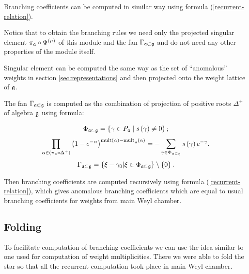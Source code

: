 \documentclass[a4paper,12pt]{article}
\theoremstyle{definition} \newtheorem{Def}{Definition}
\begin{document}
Branching coefficients can be computed in similar way using formula
(\ref{recurrent-relation}). 


Notice that to obtain the branching
rules we need only the projected singular element $\pi _{\frak{a}}\circ \Psi
^{\left( \mu\right) }$ of this module 
and the fan $\Gamma
_{\frak{a}\subset \frak{g}}$ and do not need any other properties of the module itself. 

Singular element can be computed the same way as the set of ``anomalous''
weights in section \ref{sec:representations} and then projected onto
the weight lattice of $\frak{a}$. 

The fan $\Gamma_{\frak{a}\subset \frak{g}}$ is computed as the
combination of projection of positive roots $\Delta^{+}$ of algebra
$\frak{g}$ using formula:

\begin{equation}
  \label{phi-d}
  \Phi _{\frak{a}\subset \frak{g}}=\left\{ \gamma \in P_{\frak{a}}\mid s\left(
      \gamma \right) \neq 0\right\} ;  
\end{equation}
\begin{equation}
  \label{fan-d}
  \prod_{\alpha \in \left( \pi _{\frak{a}}\circ \Delta ^{+}\right) }\left(
    1-e^{-\alpha }\right) ^{\mathrm{{mult}\left( \alpha \right) -{mult}}_{\frak{a%
      }}\mathrm{\left( \alpha \right) }}=-\sum_{\gamma \in \Phi _{\frak{a}\subset 
      \frak{g}}}s\left( \gamma \right) e^{-\gamma }.  
\end{equation}
\begin{equation}
  \label{fan-defined}
  \Gamma_{\frak{a}\subset \frak{g}}=\left\{ \xi -\gamma _{0}|\xi \in \Phi _{%
      \frak{a}\subset \frak{g}}\right\} \setminus \left\{ 0\right\} .
\end{equation}

Then branching coefficients are computed recursively using formula
(\ref{recurrent-relation}), which gives anomalous branching
coefficients which are equal to usual branching coefficients for
weights from main Weyl chamber. 

\subsection{Folding}
\label{sec:folding}

To facilitate computation of branching coefficients we can use the
idea similar to one used for computation of weight multiplicities.
There we were able to fold the star so that all the recurrent
computation took place in main Weyl chamber. 
\end{document}
